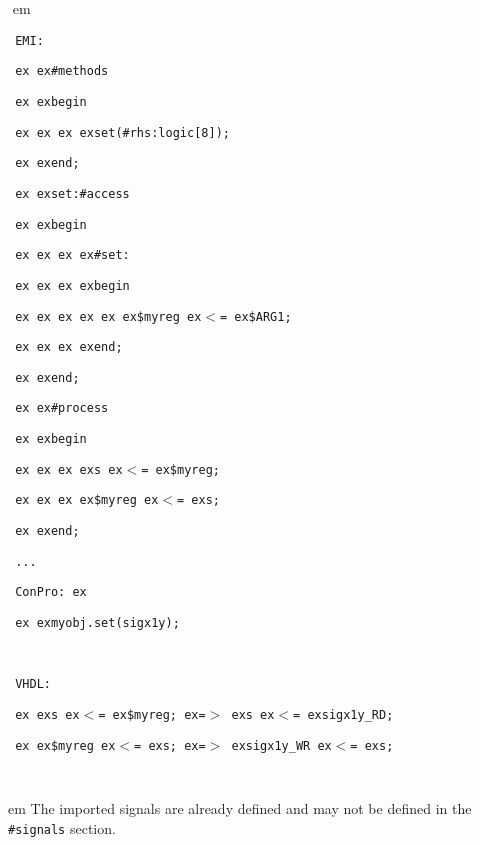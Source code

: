 \documentclass[a4paper,12pt,twoside,english]{article}
\def\s{\hskip 1.15 ex}
\begin{document}
\begin{description}
\begin{description}
\def\prefskipu{}\def\prefskipo{}\def\prefskipa{}\def\prefskipu{\hskip10pt}\def\prefskipo{\hskip10pt}\def\prefskipa{\hskip30pt}\def\content{
\vskip-5pt{\parindent0pt\parbox{\linewidth}{\tt\smallsize\hskip10pt EMI:}}
\vskip-5pt{\parindent0pt\parbox{\linewidth}{\tt\smallsize\hskip10pt \s \s \#methods}}
\vskip-5pt{\parindent0pt\parbox{\linewidth}{\tt\smallsize\hskip10pt \s \s begin}}
\vskip-5pt{\parindent0pt\parbox{\linewidth}{\tt\smallsize\hskip10pt \s \s \s \s set(\#rhs:logic{[}8{]});}}
\vskip-5pt{\parindent0pt\parbox{\linewidth}{\tt\smallsize\hskip10pt \s \s end;}}
\vskip-5pt{\parindent0pt\parbox{\linewidth}{\tt\smallsize\hskip10pt \s \s set:\#access}}
\vskip-5pt{\parindent0pt\parbox{\linewidth}{\tt\smallsize\hskip10pt \s \s begin}}
\vskip-5pt{\parindent0pt\parbox{\linewidth}{\tt\smallsize\hskip10pt \s \s \s \s \#set:}}
\vskip-5pt{\parindent0pt\parbox{\linewidth}{\tt\smallsize\hskip10pt \s \s \s \s begin}}
\vskip-5pt{\parindent0pt\parbox{\linewidth}{\tt\smallsize\hskip10pt \s \s \s \s \s \s \$myreg\s $<$=\s \$ARG1;}}
\vskip-5pt{\parindent0pt\parbox{\linewidth}{\tt\smallsize\hskip10pt \s \s \s \s end;}}
\vskip-5pt{\parindent0pt\parbox{\linewidth}{\tt\smallsize\hskip10pt \s \s end;}}
\vskip-5pt{\parindent0pt\parbox{\linewidth}{\tt\smallsize\hskip10pt \s \s \#process}}
\vskip-5pt{\parindent0pt\parbox{\linewidth}{\tt\smallsize\hskip10pt \s \s begin}}
\vskip-5pt{\parindent0pt\parbox{\linewidth}{\tt\smallsize\hskip10pt \s \s \s \s s\s $<$=\s \$myreg;}}
\vskip-5pt{\parindent0pt\parbox{\linewidth}{\tt\smallsize\hskip10pt \s \s \s \s \$myreg\s $<$=\s s;}}
\vskip-5pt{\parindent0pt\parbox{\linewidth}{\tt\smallsize\hskip10pt \s \s end;}}
\vskip-5pt{\parindent0pt\parbox{\linewidth}{\tt\smallsize\hskip10pt ...}}
\vskip-5pt{\parindent0pt\parbox{\linewidth}{\tt\smallsize\hskip10pt ConPro:\s }}
\vskip-5pt{\parindent0pt\parbox{\linewidth}{\tt\smallsize\hskip10pt \s \s myobj.set(sigx1y);}}
\vskip-5pt{\parindent0pt\parbox{\linewidth}{\tt\smallsize\hskip10pt }}
\vskip-5pt{\parindent0pt\parbox{\linewidth}{\tt\smallsize\hskip10pt VHDL:}}
\vskip-5pt{\parindent0pt\parbox{\linewidth}{\tt\smallsize\hskip10pt \s \s s\s $<$=\s \$myreg;\s =$>$\s s\s $<$=\s sigx1y\_RD;}}
\vskip-5pt{\parindent0pt\parbox{\linewidth}{\tt\smallsize\hskip10pt \s \s \$myreg\s $<$=\s s;\s =$>$\s sigx1y\_WR\s $<$=\s s;}}
\vskip-5pt{\parindent0pt\parbox{\linewidth}{\tt\smallsize\hskip10pt }}
}
$ $
 em
\content
{} em
The imported signals are already defined and may not be defined in the  {\tt \#signals} section.




\end{description}
\end{description}
\end{document}
